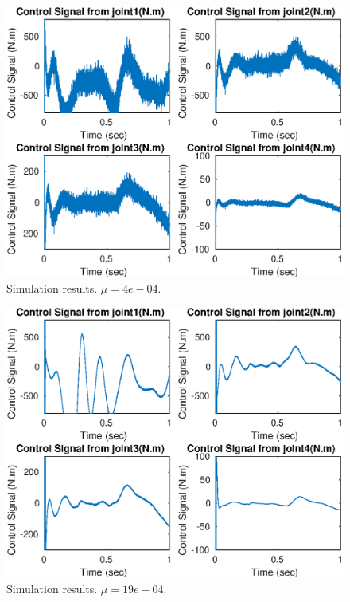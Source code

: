 \documentclass[letterpaper, 10 pt, journal, twocolumn]{IEEEtran}  %
\theoremstyle{plain}
\theoremstyle{definition}
\theoremstyle{remark}
\begin{document}
%
%
\begin{figure}[h!]
	\begin{center}
	\includegraphics[width = \columnwidth]{Figs/u_mu_fix_4e-04.eps}
	\caption{Simulation results. $\mu = 4e-04$.}
	\label{fig:timevarying4}
	\end{center}
\end{figure}
%
%
\begin{figure}[h!]
	\begin{center}
	\includegraphics[width = \columnwidth]{Figs/u_mu_fix_2e-03.eps}
	\caption{Simulation results. $\mu = 19e-04$.}
	\label{fig:timevarying4}
	\end{center}
\end{figure}
\end{document}
